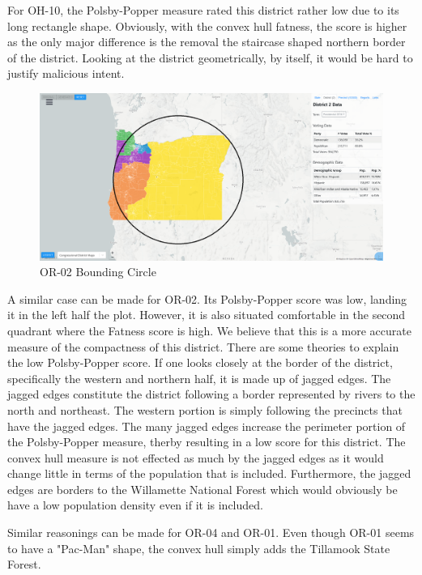 \documentclass[letterpaper]{article}
\begin{document}
For OH-10, the Polsby-Popper measure rated this district rather low due to its long rectangle shape. Obviously, with the convex hull fatness, the score is higher as the only major difference is the removal the staircase shaped northern border of the district. Looking at the district geometrically, by itself, it would be hard to justify malicious intent.

\begin{figure}[H]
	\includegraphics[width=\linewidth]{./figures/OR-02-BoundingCircle.png}
	\caption{OR-02 Bounding Circle}
	\label{fig:or02boundingCircle}
\end{figure}

A similar case can be made for OR-02. Its Polsby-Popper score was low, landing it in the left half the plot. However, it is also situated comfortable in the second quadrant where the Fatness score is high. We believe that this is a more accurate measure of the compactness of this district. There are some theories to explain the low Polsby-Popper score. If one looks closely at the border of the district, specifically the western and northern half, it is made up of jagged edges. The jagged edges constitute the district following a border represented by rivers to the north and northeast. The western portion is simply following the precincts that have the jagged edges. The many jagged edges increase the perimeter portion of the Polsby-Popper measure, therby resulting in a low score for this district. The convex hull measure is not effected as much by the jagged edges as it would change little in terms of the population that is included. Furthermore, the jagged edges are borders to the Willamette National Forest which would obviously be have a low population density even if it is included.

Similar reasonings can be made for OR-04 and OR-01. Even though OR-01 seems to have a "Pac-Man" shape, the convex hull simply adds the Tillamook State Forest.
\end{document}
